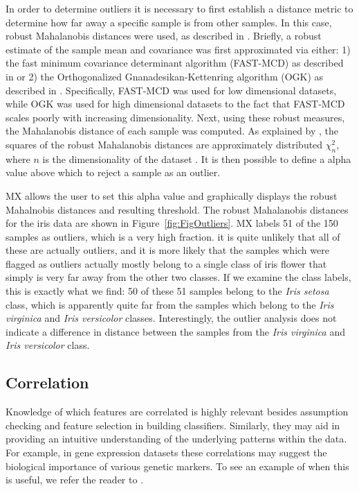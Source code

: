 \documentclass[review]{siamart0516}
\begin{document}
In order to determine outliers it is necessary to first establish a distance metric to determine how far away a specific sample is from other samples. In this case, robust Mahalanobis distances were used, as described in \cite{hubert2008high}. Briefly, a robust estimate of the sample mean and covariance was first approximated via either: 1) the fast minimum covariance determinant algorithm (FAST-MCD) as described in \cite{rousseeuw1999fast} or 2) the Orthogonalized Gnanadesikan-Kettenring algorithm (OGK) as described in \cite{maronna2002robust}. Specifically, FAST-MCD was used for low dimensional datasets, while OGK was used for high dimensional datasets to the fact that FAST-MCD scales poorly with increasing dimensionality. Next, using these robust measures, the Mahalanobis distance of each sample was computed. As explained by \cite{hardin2012distribution}, the squares of the robust Mahalanobis distances are approximately distributed $\chi^2_n$, where $n$ is the dimensionality of the dataset . It is then possible to define a alpha value above which to reject a sample as an outlier. 

MX allows the user to set this alpha value and graphically displays the robust Mahalnobis distances and resulting threshold. The robust Mahalanobis distances for the iris data are shown in Figure~\ref{fig:FigOutliers}. MX labels 51 of the 150 samples as outliers, which is a very high fraction. it is quite unlikely that all of these are actually outliers, and it is more likely that the samples which were flagged as outliers actually mostly belong to a single class of iris flower that simply is very far away from the other two classes. If we examine the class labels, this is exactly what we find: 50 of these 51 samples belong to the \textit{Iris setosa} class, which is apparently quite far from the samples which belong to the \textit{Iris virginica} and \textit{Iris versicolor} classes. Interestingly, the outlier analysis does not indicate a difference in distance between the samples from the \textit{Iris virginica} and \textit{Iris versicolor} class. 

\subsection{Correlation}
\label{subsec:SubSecCorrelation}

Knowledge of which features are correlated is highly relevant besides assumption checking and feature selection in building classifiers. Similarly, they may aid in providing an intuitive understanding of the underlying patterns within the data. For example, in gene expression datasets these correlations may suggest the biological importance of various genetic markers. To see an example of when this is useful, we refer the reader to \cite{shi2012unsupervised}.
\end{document}
